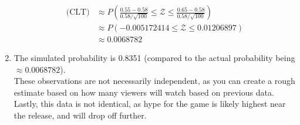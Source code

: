 \documentclass{article}
\begin{document}
\begin{enumerate}[label=(\alph*)]
\begin{align*}
              \text{(CLT)} & \approx P(\frac{0.55 - 0.58}{0.58/\sqrt{100}} \leq  \mathcal{Z} \leq \frac{0.65 - 0.58}{0.58/\sqrt{100}}) \\
                           & \approx P(-0.005172414 \leq                                      \mathcal{Z} \leq 0.01206897)             \\
                           & \approx 0.0068782
          \end{align*}
    \item The simulated probability is 0.8351 (compared to the actual probability being \(\approx 0.0068782\)). \\
          These observations are not necessarily independent, as you can create a rough estimate based on how many viewers will watch based on previous data.
          Lastly, this data is not identical, as hype for the game is likely highest near the release, and will drop off further.
\end{enumerate}
\end{document}
